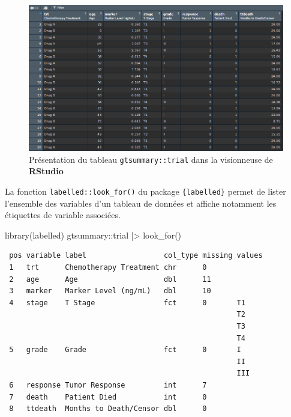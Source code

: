 \documentclass[
  letterpaper,
  DIV=11,
  numbers=noendperiod,
  oneside]{scrreprt}
\newenvironment{Shaded}{\begin{snugshade}}{\end{snugshade}}
\newcommand{\FunctionTok}[1]{\textcolor[rgb]{0.28,0.35,0.67}{#1}}
\newcommand{\NormalTok}[1]{\textcolor[rgb]{0.00,0.23,0.31}{#1}}
\newcommand{\SpecialCharTok}[1]{\textcolor[rgb]{0.37,0.37,0.37}{#1}}
\begin{document}
\begin{figure}

{\centering \includegraphics{manipulation/ressources/view_trial.png}

}

\caption{\label{fig-view-trial}Présentation du tableau
\texttt{gtsummary::trial} dans la visionneuse de \textbf{RStudio}}

\end{figure}

La fonction \texttt{labelled::look\_for()} du package
\texttt{\{labelled\}} permet de lister l'ensemble des variables d'un
tableau de données et affiche notamment les étiquettes de variable
associées.

\begin{Shaded}
\begin{Highlighting}[]
\FunctionTok{library}\NormalTok{(labelled)}
\NormalTok{gtsummary}\SpecialCharTok{::}\NormalTok{trial }\SpecialCharTok{|\textgreater{}} 
  \FunctionTok{look\_for}\NormalTok{()}
\end{Highlighting}
\end{Shaded}

\begin{verbatim}
 pos variable label                  col_type missing values
 1   trt      Chemotherapy Treatment chr      0             
 2   age      Age                    dbl      11            
 3   marker   Marker Level (ng/mL)   dbl      10            
 4   stage    T Stage                fct      0       T1    
                                                      T2    
                                                      T3    
                                                      T4    
 5   grade    Grade                  fct      0       I     
                                                      II    
                                                      III   
 6   response Tumor Response         int      7             
 7   death    Patient Died           int      0             
 8   ttdeath  Months to Death/Censor dbl      0             
\end{verbatim}
\end{document}
